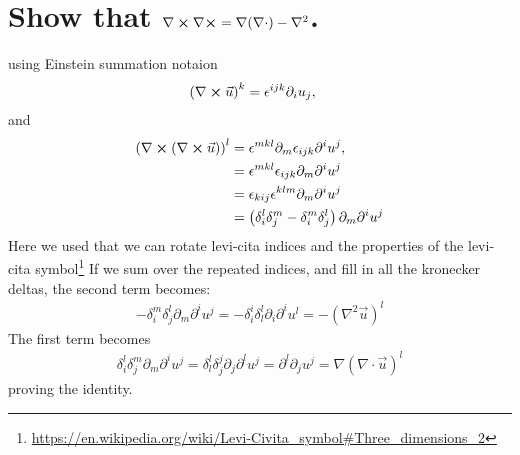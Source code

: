 \documentclass[12pt,a4paper,twosided]{article}
\begin{document}
\maketitle

\section{Show that $\nabla \cross \nabla \cross = \nabla(\nabla\cdot)-\nabla^2$.}
using Einstein summation notaion
\begin{align}
  \left(\nabla \cross \vec u\right)^k &= \epsilon^{ijk} \partial_i u_j,
\end{align}
and
\begin{align}
  \left(\nabla \cross \left(\nabla \cross \vec u\right)\right)^l &= \epsilon^{mkl} \partial_m \epsilon_{ijk} \partial^i u^j,\\
  &= \epsilon^{mkl}\epsilon_{ijk}  \partial_m \partial^i u^j\\
  &= \epsilon_{kij}\epsilon^{klm}  \partial_m \partial^i u^j\\
  &= \left( \delta_i^l \delta_j^m - \delta_i^m \delta_j^l \right)  \partial_m \partial^i u^j
\end{align}
Here we used that we can rotate levi-cita indices and the properties of the levi-cita symbol\footnote{\url{https://en.wikipedia.org/wiki/Levi-Civita_symbol\#Three_dimensions_2}}
If we sum over the repeated indices, and fill in all the kronecker deltas, the second term becomes:
\begin{align}
  - \delta_i^m \delta_j^l \partial_m \partial^i u^j = - \delta_i^i \delta_l^l \partial_i\partial^i u^l = -\left(\nabla^2 \vec u\right)^l
\end{align}
The first term becomes
\begin{align}
  \delta_i^l \delta_j^m \partial_m \partial^i u^j = \delta_l^l \delta_j^j \partial_j \partial^l u^j = \partial^l \partial_j u^j = \nabla\left(\nabla\cdot \vec u\right)^l
\end{align}
proving the identity.
\end{document}
